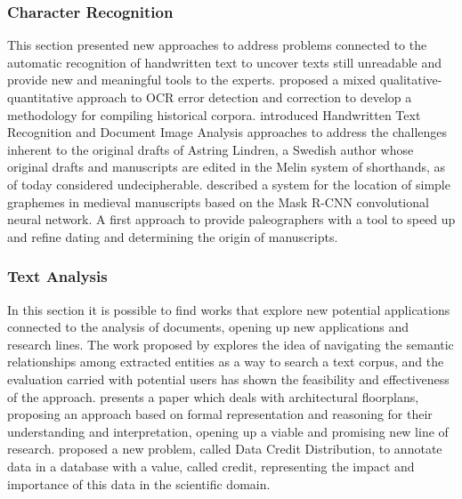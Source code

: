 \documentclass[sigconf, nonacm]{acmart}
\begin{document}
\subsubsection*{Character Recognition}
This section presented new approaches to address problems connected to the automatic recognition of handwritten text to uncover texts still unreadable and provide new and meaningful tools to the experts.
\citet{FanteN21} proposed a mixed qualitative-quantitative approach to OCR error detection and correction to develop a methodology for compiling historical corpora. 
\citet{HeilNH21} introduced Handwritten Text Recognition and Document Image Analysis approaches to address the challenges inherent to the original drafts of Astring Lindren, a Swedish author whose original drafts and manuscripts are edited in the Melin system of shorthands, as of today considered undecipherable. 
\citet{MarinaiPRS21} described a system for the location of simple graphemes in medieval manuscripts based on the Mask R-CNN convolutional neural network. A first approach to provide paleographers with a tool to speed up and refine dating and determining the origin of manuscripts.

\subsubsection*{Text Analysis}
In this section it is possible to find works that explore new potential applications connected to the analysis of documents, opening up new applications and research lines. 
The work proposed by \citet{BernasconiCM21} explores the idea of navigating the semantic relationships among extracted entities as a way to search a text corpus, and the evaluation carried with potential users has shown the feasibility and effectiveness of the approach.
\citet{Ferilli21} presents a paper which deals with architectural floorplans, proposing an approach based on formal representation and reasoning for their understanding and interpretation, opening up a viable and promising new line of research.  
\citet{DossoS21} proposed a new problem, called Data Credit Distribution, to annotate data in a database with a value, called credit, representing the impact and importance of this data in the scientific domain. 
\end{document}
